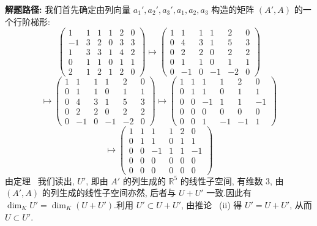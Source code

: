 \noindent\textbf{解题路径:} 我们首先确定由列向量 $a_1', a_2', a_3', a_1, a_2, a_3$ 构造的矩阵
$(A', A)$ 的一个行阶梯形:
\[
\begin{pmatrix} 1 & 1 & 1 & 1 & 2 & 0 \\ -1 & 3 & 2 & 0 & 3 & 3 \\ 1 & 3 & 3 & 1 & 4 & 2 \\ 0 & 1 & 1 & 0 & 1 & 1 \\ 2 & 1 & 2 & 1 & 2 & 0 \end{pmatrix}
\longmapsto \begin{pmatrix} 1 & 1 & 1 & 1 & 2 & 0 \\ 0 & 4 & 3 & 1 & 5 & 3 \\ 0 & 2 & 2 & 0 & 2 & 2 \\ 0 & 1 & 1 & 0 & 1 & 1 \\ 0 & -1 & 0 & -1 & -2 & 0 \end{pmatrix}
\]
\[
\longmapsto \begin{pmatrix} 1 & 1 & 1 & 1 & 2 & 0 \\ 0 & 1 & 1 & 0 & 1 & 1 \\ 0 & 4 & 3 & 1 & 5 & 3 \\ 0 & 2 & 2 & 0 & 2 & 2 \\ 0 & -1 & 0 & -1 & -2 & 0 \end{pmatrix}
\longmapsto \begin{pmatrix} 1 & 1 & 1 & 1 & 2 & 0 \\ 0 & 1 & 1 & 0 & 1 & 1 \\ 0 & 0 & -1 & 1 & 1 & -1 \\ 0 & 0 & 0 & 0 & 0 & 0 \\ 0 & 0 & 1 & -1 & -1 & 1 \end{pmatrix}
\]
\[
\longmapsto \begin{pmatrix} 1 & 1 & 1 & 1 & 2 & 0 \\ 0 & 1 & 1 & 0 & 1 & 1 \\ 0 & 0 & -1 & 1 & 1 & -1 \\ 0 & 0 & 0 & 0 & 0 & 0 \\ 0 & 0 & 0 & 0 & 0 & 0 \end{pmatrix}
\]
由定理~ 我们读出, $U'$, 即由 $A'$ 的列生成的 $\mathbb{R}^5$ 的线性子空间,
有维数 3, 由 $(A', A)$ 的列生成的线性子空间亦然, 后者与 $U + U'$ 一致.因此有
$\dim_K U' = \dim_K(U + U')$.利用 $U' \subset U + U'$, 由推论~ (ii) 得
$U' = U + U'$, 从而 $U \subset U'$.

